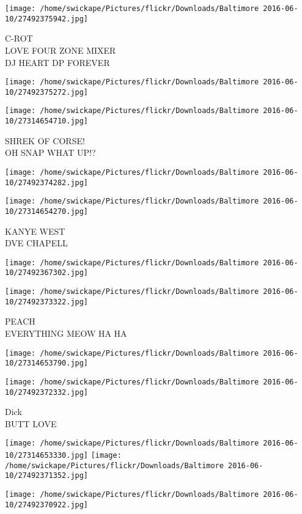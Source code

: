 \documentclass[10pt,letterpaper]{article}
\begin{document}
\texttt{[image: /home/swickape/Pictures/flickr/Downloads/Baltimore 2016-06-10/27492375942.jpg]}

C{-}ROT\\
LOVE FOUR ZONE MIXER\\
DJ HEART DP FOREVER
\pagebreak

\texttt{[image: /home/swickape/Pictures/flickr/Downloads/Baltimore 2016-06-10/27492375272.jpg]}

\vspace{0.25in}
\texttt{[image: /home/swickape/Pictures/flickr/Downloads/Baltimore 2016-06-10/27314654710.jpg]}

SHREK OF CORSE!\\
OH SNAP WHAT UP!?
\pagebreak

\texttt{[image: /home/swickape/Pictures/flickr/Downloads/Baltimore 2016-06-10/27492374282.jpg]}

\vspace{0.25in}
\texttt{[image: /home/swickape/Pictures/flickr/Downloads/Baltimore 2016-06-10/27314654270.jpg]}

KANYE WEST\\
DVE CHAPELL
\pagebreak

\texttt{[image: /home/swickape/Pictures/flickr/Downloads/Baltimore 2016-06-10/27492367302.jpg]}

\vspace{0.25in}
\texttt{[image: /home/swickape/Pictures/flickr/Downloads/Baltimore 2016-06-10/27492373322.jpg]}

PEACH\\
EVERYTHING MEOW HA HA
\pagebreak

\texttt{[image: /home/swickape/Pictures/flickr/Downloads/Baltimore 2016-06-10/27314653790.jpg]}

\vspace{0.25in}
\texttt{[image: /home/swickape/Pictures/flickr/Downloads/Baltimore 2016-06-10/27492372332.jpg]}

Dick\\
BUTT LOVE
\pagebreak

\texttt{[image: /home/swickape/Pictures/flickr/Downloads/Baltimore 2016-06-10/27314653330.jpg]}
\texttt{[image: /home/swickape/Pictures/flickr/Downloads/Baltimore 2016-06-10/27492371352.jpg]}

\vspace{0.25in}
\texttt{[image: /home/swickape/Pictures/flickr/Downloads/Baltimore 2016-06-10/27492370922.jpg]}
\end{document}
